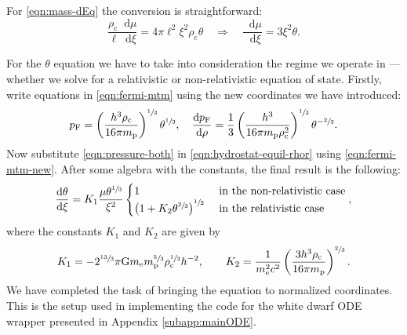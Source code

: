 \documentclass[]{article}
\newcommand{\dd}{\mathop{}\!\mathrm{d}}
\newcommand{\rhoCentre}{\rho_\mathrm{c}}
\newcommand{\fermiMtm}{p_\mathrm{F}}
\newcommand{\massElectron}{m_\mathrm{e}}
\newcommand{\massProton}{m_\mathrm{p}}
\newcommand{\gravconst}{\mathrm{G}}
\begin{document}
	For \eqref{eqn:mass-dEq}  the conversion is straightforward:
	\begin{equation}
		\frac{\rhoCentre \dd \mu}{\ell \dd \xi} = 4 \pi \ell^2 \xi^2 \rhoCentre \theta \quad \Rightarrow \quad \frac{\dd \mu}{\dd \xi} = 3 \xi^2 \theta.
	\end{equation}

	For the $\theta$ equation we have to take into consideration the regime we operate in --- whether we solve for a relativistic or non-relativistic equation of state. Firstly, write equations in \eqref{eqn:fermi-mtm} using the new coordinates we have introduced:
	\begin{equation}\label{eqn:fermi-mtm-new}
		\fermiMtm = \left( \frac{h^3 \rhoCentre}{16 \pi \massProton}\right)^{\sfrac{1}{3}} \theta^{\sfrac{1}{3}} , \quad \frac{\dd \fermiMtm}{\dd \rho} = \frac{1}{3} \left( \frac{h^3}{16 \pi \massProton \rhoCentre^2}\right)^{\sfrac{1}{3}} \theta^{-\sfrac{2}{3}}.
	\end{equation}
	Now substitute \eqref{eqn:pressure-both} in \eqref{eqn:hydrostat-equil-rhor} using \eqref{eqn:fermi-mtm-new}. After some algebra with the constants, the final result is the following:
	\begin{equation}
		\frac{\dd \theta}{\dd \xi} = K_1 \frac{\mu \theta^{\sfrac{1}{3}}}{\xi^2} \begin{cases}
			1 & \text{ in the non-relativistic case}\\
			\left(1 + K_2 \theta^{\sfrac{2}{3}}\right)^{\sfrac{1}{2}} & \text{ in the relativistic case}
		\end{cases},
	\end{equation}
	where the constants $K_1$ and $K_2$ are given by
	\begin{equation}
		K_1 = - 2^{\sfrac{13}{3}} \pi \gravconst \massElectron \massProton^{\sfrac{5}{3}} \rhoCentre^{\sfrac{1}{3}} h^{-2} , \quad \quad K_2 = \frac{1}{\massElectron^2 c^2} \left( \frac{3h^3 \rhoCentre}{16 \pi \massProton} \right)^{\sfrac{2}{3}}.
	\end{equation}
	We have completed the task of bringing the equation to normalized coordinates. This is the setup used in implementing the code for the white dwarf ODE wrapper presented in Appendix \ref{subapp:mainODE}.
\end{document}
